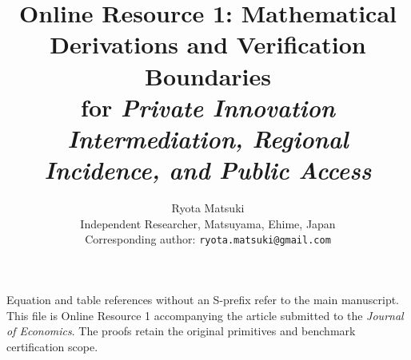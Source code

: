 \documentclass[11pt]{article}
\title{Online Resource 1: Mathematical Derivations and Verification Boundaries\\
for \emph{Private Innovation Intermediation, Regional Incidence, and Public Access}}
\author{Ryota Matsuki\\
{\small Independent Researcher, Matsuyama, Ehime, Japan}\\
{\small Corresponding author: \texttt{ryota.matsuki@gmail.com}}}
\date{}
\begin{document}
\maketitle
\noindent Equation and table references without an S-prefix refer to the main manuscript.
This file is Online Resource 1 accompanying the article submitted to the
\emph{Journal of Economics}. The proofs retain the original primitives and
benchmark certification scope.


\end{document}

